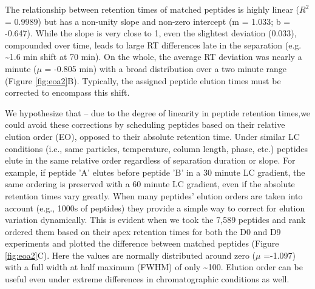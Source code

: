 The relationship between retention times of matched peptides is highly linear ($R^2$ = 0.9989) but has a non-unity slope and non-zero intercept (m = 1.033; b = -0.647). While the slope is very close to 1, even the slightest deviation (0.033), compounded over time, leads to large RT differences late in the separation (e.g. \textasciitilde1.6 min shift at 70 min). On the whole, the average RT deviation was nearly a minute ($\mu$ = -0.805 min) with a broad distribution over a two minute range (Figure \ref{fig:eoa2}B). Typically, the assigned peptide elution times must be corrected to encompass this shift.

We hypothesize that -- due to the degree of linearity in peptide retention times,we could avoid these corrections by scheduling peptides based on their relative elution order (EO), opposed to their absolute retention time. Under similar LC conditions (i.e., same particles, temperature, column length, phase, etc.) peptides elute in the same relative order regardless of separation duration or slope. For example, if peptide 'A' elutes before peptide 'B' in a 30 minute LC gradient, the same ordering is preserved with a 60 minute LC gradient, even if the absolute retention times vary greatly. When many peptides’ elution orders are taken into account (e.g., 1000s of peptides) they provide a simple way to correct for elution variation dynamically. This is evident when we took the 7,589 peptides and rank ordered them based on their apex retention times for both the D0 and D9 experiments and plotted the difference between matched peptides (Figure \ref{fig:eoa2}C). Here the values are normally distributed around zero ($\mu$ =-1.097) with a full width at half maximum (FWHM) of only \textasciitilde100. Elution order can be useful even under extreme differences in chromatographic conditions as well.
